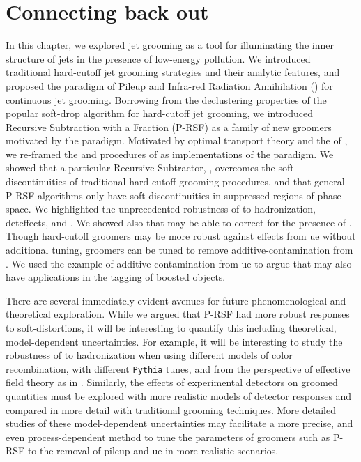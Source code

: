 \section{Connecting back out}
In this chapter, we explored jet grooming as a tool for illuminating the inner structure of jets in the presence of low-energy pollution.
%
We introduced traditional hard-cutoff jet grooming strategies and their analytic features, and proposed the paradigm of Pileup and Infra-red Radiation Annihilation (\PIRANHA{}) for continuous jet grooming.
%
Borrowing from the declustering properties of the popular \gls{soft-drop} algorithm for hard-cutoff jet grooming, we introduced Recursive Subtraction with a Fraction (P-RSF) as a family of new groomers motivated by the \PIRANHA{} paradigm.
%
Motivated by optimal transport theory and the  of , we re-framed the  and  procedures of  as implementations of the \PIRANHA{} paradigm.
%
We showed that a particular Recursive Subtractor, , overcomes the soft discontinuities of traditional hard-cutoff grooming procedures, and that general P-RSF algorithms only have soft discontinuities in suppressed regions of phase space.
%
We highlighted the unprecedented robustness of  to \gls{hadronization}, \gls{deteffects}, and .
%
We showed also that  may be able to correct for the presence of .
%
Though hard-cutoff groomers may be more robust against effects from \gls{ue} without additional tuning, \PIRANHA{} groomers can be tuned to remove \gls{additive-contamination} from .
%
We used the example of \gls{additive-contamination} from \gls{ue} to argue that \PIRANHA{} may also have applications in the tagging of boosted objects.

There are several immediately evident avenues for future phenomenological and theoretical exploration.
%
While we argued that P-RSF had more robust responses to \glspl{soft-distortion}, it will be interesting to quantify this including theoretical, model-dependent uncertainties.
%
For example, it will be interesting to study the robustness of  to \gls{hadronization} when using different models of color recombination, with different \texttt{Pythia} tunes, and from the perspective of effective field theory as in .
%
Similarly, the effects of experimental detectors on  groomed quantities must be explored with more realistic models of detector responses and compared in more detail with traditional grooming techniques.
%
More detailed studies of these model-dependent uncertainties may facilitate a more precise, and even process-dependent method to tune the parameters of \PIRANHA{} groomers such as P-RSF to the removal of \gls{pileup} and \gls{ue} in more realistic scenarios.


